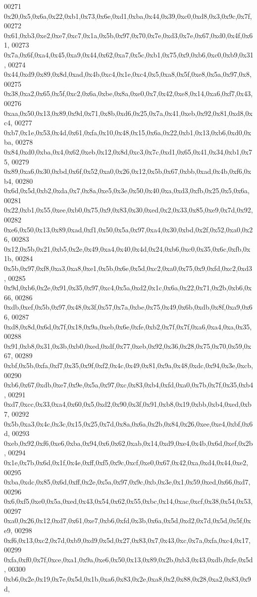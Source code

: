 \begin{DoxyCode}
00271   0x20,0x5,0x6a,0x22,0xb1,0x73,0x6e,0xd1,0xba,0x44,0x39,0xc0,0xd8,0x3,0x9c,0x7f,
00272   0x61,0xb3,0xe2,0xe7,0xc7,0x1a,0x5b,0x97,0x70,0x7e,0xd3,0x7e,0x67,0xd0,0x4f,0x61,
00273   0x7a,0x6f,0xa4,0x45,0xa9,0x44,0x62,0xa7,0x5c,0xb1,0x75,0x9,0xb6,0xc0,0xb9,0x31,
00274   0x44,0xd9,0x89,0x8d,0xad,0x4b,0xc4,0x1e,0xc4,0x5,0xa8,0x5f,0xe8,0x5a,0x97,0x8,
00275   0x38,0xa2,0x65,0x5f,0xc2,0x6a,0xbe,0x8a,0xe0,0x7,0x42,0xe8,0x14,0xa6,0xf7,0x43,
00276   0xaa,0x50,0x13,0x89,0x9d,0x71,0x8b,0xd6,0x25,0x7a,0x41,0xeb,0x92,0x81,0xd8,0xc4,
00277   0xb7,0x1e,0x53,0x4d,0x61,0xfa,0x10,0x48,0x15,0x6a,0x22,0xb1,0x13,0xb6,0xd0,0xba,
00278   0x84,0xd0,0xba,0x4,0x62,0xeb,0x12,0x8d,0xc3,0x7c,0xd1,0x65,0x41,0x34,0xb1,0x75,
00279   0x89,0xa6,0x30,0xbd,0x6f,0x52,0xa0,0x26,0x12,0x5b,0x67,0xbb,0xad,0x4b,0xf6,0xb4,
00280   0x6d,0x5d,0xb2,0xda,0x7,0x8a,0xe5,0x3e,0x50,0x40,0xa,0xd3,0xfb,0x25,0x5,0x6a,
00281   0x22,0xb1,0x55,0xee,0xb0,0x75,0x9,0x83,0x30,0xed,0x2,0x33,0x85,0xe9,0x7d,0x92,
00282   0xe6,0x50,0x13,0x89,0xad,0xf1,0x50,0x5a,0x97,0xa4,0x30,0xbd,0x2f,0x52,0xa0,0x26,
00283   0x12,0x5b,0x21,0xb5,0x2e,0x49,0xa4,0x40,0x4d,0x24,0xb6,0xc0,0x35,0x6c,0xfb,0x1b,
00284   0x5b,0x97,0xf8,0xa3,0xa8,0xe1,0x5b,0x6e,0x5d,0xc2,0xa0,0x75,0x9,0xfd,0xc2,0xd3,
00285   0x9d,0xb6,0x2e,0x91,0x35,0x97,0xc4,0x5a,0xd2,0x1c,0x6a,0x22,0x71,0x2b,0xb6,0x66,
00286   0xdb,0xef,0x5b,0x97,0x48,0x3f,0x57,0x7a,0xbe,0x75,0x49,0x6b,0xdb,0x8f,0xa9,0x66,
00287   0xd8,0x8d,0x6d,0x7f,0x18,0x9a,0xeb,0x6e,0xfe,0xb2,0x7f,0x7f,0xa6,0xa4,0xa,0x35,
00288   0x91,0xb8,0x31,0x3b,0xb0,0xed,0xdf,0x77,0xeb,0x92,0x36,0x28,0x75,0x70,0x59,0x67,
00289   0xbf,0x5b,0xfa,0xf7,0x35,0x9f,0xf2,0x4c,0x49,0x81,0x9a,0x48,0xdc,0x94,0x3e,0xcb,
00290   0xb6,0x67,0xdb,0xe7,0x9e,0x5a,0x97,0xc,0x83,0xb4,0xfd,0xa0,0x7b,0x7f,0x35,0xb4,
00291   0xd7,0xcc,0x33,0xa4,0x60,0x5,0xd2,0x90,0x3f,0x91,0xb8,0x19,0xbb,0xb4,0xed,0xb7,
00292   0x5b,0xa3,0x4c,0x3c,0x15,0x25,0x7d,0x8a,0x6a,0x2b,0x84,0x26,0xee,0xe4,0xbf,0x6d,
00293   0xeb,0x92,0xf6,0xe6,0xba,0x94,0x6,0x62,0xab,0x14,0xd9,0xe4,0x4b,0x6d,0xef,0x2b,
00294   0x1e,0x7b,0x6d,0x1f,0x4e,0xff,0xf5,0x9c,0xcf,0xe0,0x67,0x42,0xa,0xd4,0x44,0xe2,
00295   0xba,0xdc,0x85,0x6d,0xff,0x2e,0x5a,0x97,0x9c,0xb,0x3e,0x1,0x59,0xed,0x66,0xd7,
00296   0x6,0xf5,0xe0,0x5a,0xed,0x43,0x54,0x62,0x55,0xbc,0x14,0xac,0xcf,0x38,0x54,0x53,
00297   0xa0,0x26,0x12,0xd7,0x61,0xe7,0xb6,0xfd,0x3b,0x6a,0x5d,0xd2,0x7d,0x5d,0x5f,0xe9,
00298   0xf6,0x13,0xc2,0x7d,0xb9,0xd9,0x5d,0x27,0x83,0x7,0x43,0xc,0x7a,0xfa,0xc4,0x17,
00299   0xfa,0xf0,0x7f,0xce,0xa1,0x9a,0xe6,0x50,0x13,0x89,0x2b,0xb3,0x43,0xdb,0xfe,0x5d,
00300   0xb6,0x2e,0x19,0x7e,0x5d,0x1b,0xa6,0x83,0x2e,0xa8,0x2,0x88,0x28,0xa2,0x83,0x9d,

\end{DoxyCode}

